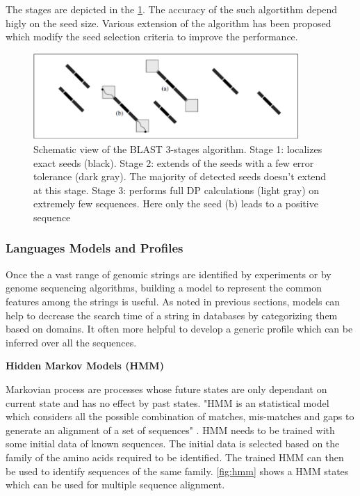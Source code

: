 \documentclass[12pt,twoside]{article}
\begin{document}
The stages are depicted in the \cref{fig:blastview}. The accuracy of the such algortithm depend higly on the seed size. Various extension of the algorithm has been proposed which
modify the seed selection criteria to improve the performance.

\begin{figure}%
    \centering
    \includegraphics[width=0.9\textwidth]{fig/blastview}
    \caption{Schematic view of the BLAST 3-stages algorithm. Stage 1: localizes
	exact seeds (black). Stage 2: extends of the seeds with a few error tolerance (dark
	gray). The majority of detected seeds doesn’t extend at this stage. Stage 3: performs
	full DP calculations (light gray) on extremely few sequences. Here only the seed (b)
	leads to a positive sequence \cite[Figure 8.11]{gokhale_reconfigurable_2010}}
    \label{fig:blastview}
\end{figure}

\subsubsection{Languages Models and Profiles}

Once the a vast range of genomic strings are identified by experiments or by genome sequencing algorithms, building
a model to represent the common features among the strings is useful. As noted in previous sections, models can help
to decrease the search time of a string in databases by categorizing them based on domains. It often more helpful
to develop a generic profile which can be inferred over all the sequences.

\begin{flushleft}
\textbf{Hidden Markov Models (HMM)}
\end{flushleft}

Markovian process are processes whose future states are only dependant on current state and has no effect by past states.
"HMM \cite{hughey_hidden_1996} is an statistical model which considers all the possible combination of matches, mis-matches and gaps to generate an
alignment of a set of sequences" \cite{mount_bioinformatics:_2004}. HMM needs to be trained with some initial data of known
sequences. The initial data is selected based on the family of the amino acids required to be identified. The trained HMM 
can then be used to identify sequences of the same family. \cref{fig:hmm} shows a HMM states which can be used for multiple
sequence alignment.
\end{document}
